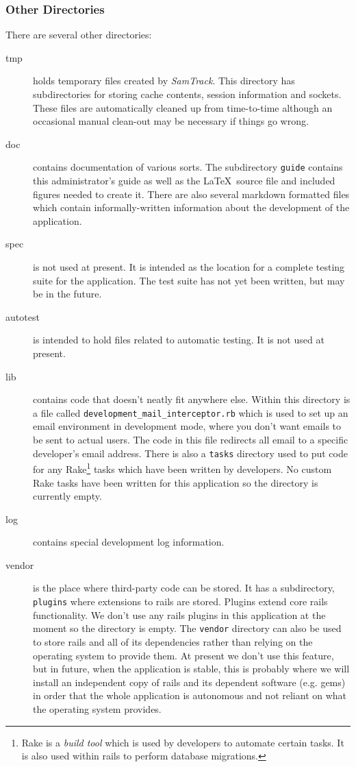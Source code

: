 \documentclass[12pt,twoside]{article}
\newcommand{\samtrack}{\emph{SamTrack}}
\begin{document}
\subsubsection{Other Directories}
There are several other directories:
\begin{description}
\item[tmp]
holds temporary files created by \samtrack.
This directory has subdirectories for storing
cache contents, session information and sockets. These files are automatically
cleaned up from time-to-time although an occasional manual clean-out may be
necessary if things go wrong.
\item[doc]
contains documentation of various sorts.
The subdirectory \verb=guide= contains this administrator's guide as well
as the \LaTeX\ source file and included figures needed to create it.
There are also several markdown formatted files which contain 
informally-written information about the development of the application.
\item[spec]
is not used at present. It is intended as the location for
a complete testing suite for the application. The test suite has not yet
been written, but may be in the future.
\item[autotest]
is intended to hold files related to automatic testing.
It is not used at present.
\item[lib]
contains code that doesn't neatly fit anywhere else.
Within this directory is a file called 
\verb=development_mail_interceptor.rb=
which is used to set up an email environment in development mode, where
you don't want emails to be sent to actual users. The code in this file
redirects all email to a specific developer's email address.
There is also a \verb=tasks= directory used to put code for any
Rake\footnote{Rake is a \emph{build tool} which is used by developers to
automate certain tasks. It is also used within rails to perform database 
migrations.} tasks which have been written by developers. No custom
Rake tasks have been written for this application so the directory is
currently empty.
\item[log]
contains special development log information.
\item[vendor]
is the place where third-party code can be stored. It has a subdirectory,
\verb=plugins= where extensions to rails are stored. Plugins
extend core rails functionality. We don't use any rails plugins in this
application at the moment so the directory is empty. The \verb=vendor=
directory can also be used to store rails and all of its dependencies
rather than relying on the operating system to provide them. At present
we don't use this feature, but in future, when the application is stable,
this is probably where we will install an independent copy of rails and
its dependent software (e.g. gems) in order that the whole application
is autonomous and not reliant on what the operating system provides.
\end{description}
\end{document}
